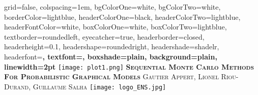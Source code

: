 \documentclass[portrait,final,a0paper,fontscale=0.277]{baposter}
\begin{document}
\begin{poster}%
  {
  grid=false,
  colspacing=1em,
  bgColorOne=white,
  bgColorTwo=white,
  borderColor=lightblue,
  headerColorOne=black,
  headerColorTwo=lightblue,
  headerFontColor=white,
  boxColorOne=white,
  boxColorTwo=lightblue,
  textborder=roundedleft,
  eyecatcher=true,
  headerborder=closed,
  headerheight=0.1\textheight,
  headershape=roundedright,
  headershade=shadelr,
  headerfont=\Large\bf\textsc, %
  textfont={\setlength{\parindent}{1.5em}},
  boxshade=plain,
  background=plain,
  linewidth=2pt
  }
  {\texttt{[image: plot1.png]}} 
  {\bf\textsc{Sequential Monte Carlo Methods For Probabilistic Graphical Models}\vspace{0.5em}}
  {\textsc{Gautier Appert, Lionel Riou-Durand, Guillaume Salha}}
  {%
    \texttt{[image: logo\_ENS.jpg]}
  }

    \newcommand{\colouredcircle}{%
      \tikz{\useasboundingbox (-0.2em,-0.32em) rectangle(0.2em,0.32em); \draw[draw=black,fill=lightblue,line width=0.03em] (0,0) circle(0.18em);}}

\end{poster}
\end{document}
